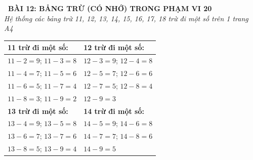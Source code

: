 \documentclass[11pt,a4paper]{article}
\begin{document}
\begin{tcolorbox}[
  enhanced,
  colback=violet!8!white,
  colframe=violet!70!black,
  arc=3mm, boxrule=1.2pt,
  left=3mm, right=3mm, top=2mm, bottom=2mm,
  halign=center
]
  {\LARGE\bfseries\color{violet!90!black}\faBookmark\ BÀI 12: BẢNG TRỪ (CÓ NHỚ) TRONG PHẠM VI 20}\\[1mm]
  {\itshape\footnotesize\color{black!75} Hệ thống các bảng trừ 11, 12, 13, 14, 15, 16, 17, 18 trừ đi một số trên 1 trang A4}
\end{tcolorbox}

\vspace{-2mm}

\noindent
\begin{minipage}[t]{0.49\textwidth}\vspace{0pt}
\begin{tcolorbox}[
  enhanced,
  colback=violet!4!white,
  colframe=violet!75!black,
  arc=2mm, boxrule=0.8pt,
  left=2mm, right=2mm, top=1.8mm, bottom=1.8mm,
  title={\footnotesize\bfseries\color{white}\faKey\ 1. Bảng trừ 11, 12, 13, 14}
]
{\footnotesize
\begin{tabular}{l|l}
  \textbf{11 trừ đi một số:} & \textbf{12 trừ đi một số:} \\ \hline
  $11 - 2 = 9$; $11 - 3 = 8$ & $12 - 3 = 9$; $12 - 4 = 8$ \\
  $11 - 4 = 7$; $11 - 5 = 6$ & $12 - 5 = 7$; $12 - 6 = 6$ \\
  $11 - 6 = 5$; $11 - 7 = 4$ & $12 - 7 = 5$; $12 - 8 = 4$ \\
  $11 - 8 = 3$; $11 - 9 = 2$ & $12 - 9 = 3$ \\ \hline
  \textbf{13 trừ đi một số:} & \textbf{14 trừ đi một số:} \\ \hline
  $13 - 4 = 9$; $13 - 5 = 8$ & $14 - 5 = 9$; $14 - 6 = 8$ \\
  $13 - 6 = 7$; $13 - 7 = 6$ & $14 - 7 = 7$; $14 - 8 = 6$ \\
  $13 - 8 = 5$; $13 - 9 = 4$ & $14 - 9 = 5$
\end{tabular}
}
\end{tcolorbox}
\end{minipage}
\hfill
\end{document}

